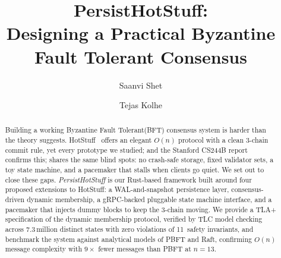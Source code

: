 \documentclass{SVProc}
\begin{document}
\mainmatter

\title{PersistHotStuff:\\ Designing a Practical Byzantine Fault Tolerant Consensus}


\author{Saanvi Shet \and Tejas Kolhe}




\maketitle

\begin{abstract}
Building a working Byzantine Fault Tolerant(BFT) consensus system is harder than the theory
suggests.  HotStuff~\cite{hotstuff2019} offers an elegant $O(n)$
protocol with a clean 3-chain commit rule, yet every prototype we
studied; and the Stanford CS244B report~\cite{stanford_hotstuff2024}
confirms this; shares the same blind spots: no crash-safe storage,
fixed validator sets, a toy state machine, and a pacemaker that stalls
when clients go quiet.  We set out to close these gaps.
\textit{PersistHotStuff} is our Rust-based framework built around four
proposed extensions to HotStuff: a WAL-and-snapshot persistence layer,
consensus-driven dynamic membership, a gRPC-backed pluggable state
machine interface, and a pacemaker that injects dummy blocks to keep the 3-chain moving.
We provide a TLA+ specification of the dynamic membership protocol,
verified by TLC model checking across 7.3\,million distinct states with zero
violations of 11~safety invariants, and benchmark the system against
analytical models of PBFT and Raft, confirming $O(n)$ message complexity
with $9\times$ fewer messages than PBFT at $n{=}13$.


\end{abstract}

\end{document}
